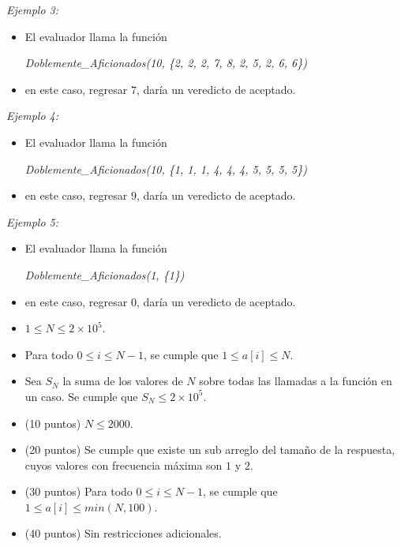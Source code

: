 \documentclass[12pt]{scrartcl}
\begin{document}
        {\itshape Ejemplo 3:}
        \begin{itemize}
            \item El evaluador llama la función 
            
            \begin{center}
                {\itshape Doblemente\_Aficionados(10, \{2, 2, 2, 7, 8, 2, 5, 2, 6, 6\})}
            \end{center}

            \item en este caso, regresar $7$, daría un veredicto de aceptado.
        \end{itemize}

        {\itshape Ejemplo 4:}
        \begin{itemize}
            \item El evaluador llama la función 

            \begin{center}
                {\itshape Doblemente\_Aficionados(10, \{1, 1, 1, 4, 4, 4, 5, 5, 5, 5\})}
            \end{center}

            \item en este caso, regresar $9$, daría un veredicto de aceptado.
        \end{itemize}
        
        {\itshape Ejemplo 5:}
        \begin{itemize}
            \item El evaluador llama la función 

            \begin{center}
                {\itshape Doblemente\_Aficionados(1, \{1\})}
            \end{center}

            \item en este caso, regresar $0$, daría un veredicto de aceptado.
        \end{itemize}
        
        \begin{itemize}
            \item $1 \le N \le 2 \times 10^5$.
            \item Para todo $0 \le i \le N - 1$, se cumple que $1 \le a[i] \le N$.
            \item Sea $S_N$ la suma de los valores de $N$ sobre todas las llamadas a la función en un caso. Se cumple que $S_N \le 2\times10^5$.
        \end{itemize}
    


    \begin{itemize}
        \item (10 puntos) $N \le 2000$.
        \item (20 puntos) Se cumple que existe un sub arreglo del tamaño de la respuesta, cuyos valores con frecuencia máxima son $1$ y $2$.
        \item (30 puntos) Para todo $0 \le i \le N - 1$, se cumple que $1 \le a[i] \le min(N, 100)$.
        \item (40 puntos) Sin restricciones adicionales.
    \end{itemize}
\end{document}
